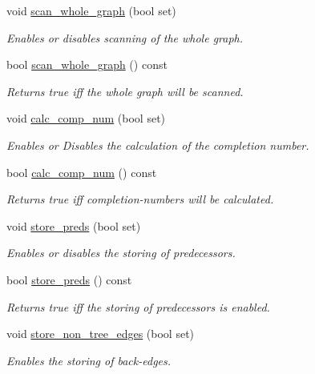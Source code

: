 \begin{DoxyCompactItemize}
void \mbox{\hyperlink{classdfs_aa7c864a6f3a120720138b187b3ed95b5}{scan\+\_\+whole\+\_\+graph}} (bool set)
\begin{DoxyCompactList}\small\item\em Enables or disables scanning of the whole graph. \end{DoxyCompactList}\item 
bool \mbox{\hyperlink{classdfs_a025ed2d6101a7b9f72578a52b484ef50}{scan\+\_\+whole\+\_\+graph}} () const
\begin{DoxyCompactList}\small\item\em Returns true iff the whole graph will be scanned. \end{DoxyCompactList}\item 
void \mbox{\hyperlink{classdfs_a70862ea715c52eb95fb704afd3a6e676}{calc\+\_\+comp\+\_\+num}} (bool set)
\begin{DoxyCompactList}\small\item\em Enables or Disables the calculation of the completion number. \end{DoxyCompactList}\item 
bool \mbox{\hyperlink{classdfs_aba80ac24a78448f10b32473633cd2a5d}{calc\+\_\+comp\+\_\+num}} () const
\begin{DoxyCompactList}\small\item\em Returns true iff completion-\/numbers will be calculated. \end{DoxyCompactList}\item 
void \mbox{\hyperlink{classdfs_a7043f46eb3887cbcbb1391fc783407a4}{store\+\_\+preds}} (bool set)
\begin{DoxyCompactList}\small\item\em Enables or disables the storing of predecessors. \end{DoxyCompactList}\item 
bool \mbox{\hyperlink{classdfs_ad0233128f2958d630102096aa6f3b9ef}{store\+\_\+preds}} () const
\begin{DoxyCompactList}\small\item\em Returns true iff the storing of predecessors is enabled. \end{DoxyCompactList}\item 
void \mbox{\hyperlink{classdfs_a6f54f1c4339eacc8961e795439d4593d}{store\+\_\+non\+\_\+tree\+\_\+edges}} (bool set)
\begin{DoxyCompactList}\small\item\em Enables the storing of back-\/edges. \end{DoxyCompactList}\item 

\end{DoxyCompactItemize}
